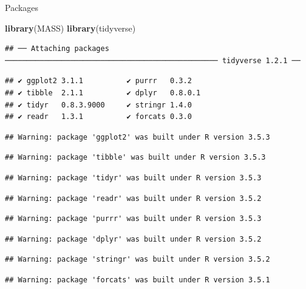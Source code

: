 \documentclass[ignorenonframetext,]{beamer}
\newenvironment{Shaded}{\begin{snugshade}}{\end{snugshade}}
\newcommand{\KeywordTok}[1]{\textcolor[rgb]{0.13,0.29,0.53}{\textbf{#1}}}
\newcommand{\NormalTok}[1]{#1}
\begin{document}
\begin{frame}[fragile]{Packages}
\protect\hypertarget{packages-6}{}

\begin{Shaded}
\begin{Highlighting}[]
\KeywordTok{library}\NormalTok{(MASS)}
\KeywordTok{library}\NormalTok{(tidyverse)}
\end{Highlighting}
\end{Shaded}

\begin{verbatim}
## ── Attaching packages ───────────────────────────────────────────────── tidyverse 1.2.1 ──
\end{verbatim}

\begin{verbatim}
## ✔ ggplot2 3.1.1          ✔ purrr   0.3.2     
## ✔ tibble  2.1.1          ✔ dplyr   0.8.0.1   
## ✔ tidyr   0.8.3.9000     ✔ stringr 1.4.0     
## ✔ readr   1.3.1          ✔ forcats 0.3.0
\end{verbatim}

\begin{verbatim}
## Warning: package 'ggplot2' was built under R version 3.5.3
\end{verbatim}

\begin{verbatim}
## Warning: package 'tibble' was built under R version 3.5.3
\end{verbatim}

\begin{verbatim}
## Warning: package 'tidyr' was built under R version 3.5.3
\end{verbatim}

\begin{verbatim}
## Warning: package 'readr' was built under R version 3.5.2
\end{verbatim}

\begin{verbatim}
## Warning: package 'purrr' was built under R version 3.5.3
\end{verbatim}

\begin{verbatim}
## Warning: package 'dplyr' was built under R version 3.5.2
\end{verbatim}

\begin{verbatim}
## Warning: package 'stringr' was built under R version 3.5.2
\end{verbatim}

\begin{verbatim}
## Warning: package 'forcats' was built under R version 3.5.1
\end{verbatim}


\end{frame}
\end{document}
